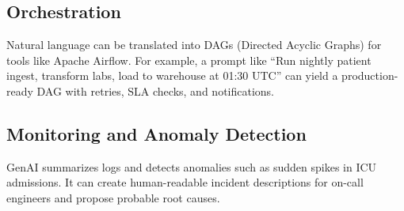 \documentclass[conference]{IEEEtran}
\begin{document}
\subsection{Orchestration}
Natural language can be translated into DAGs (Directed Acyclic Graphs) for tools like Apache Airflow. For example, a prompt like “Run nightly patient ingest, transform labs, load to warehouse at 01:30 UTC” can yield a production-ready DAG with retries, SLA checks, and notifications.

\subsection{Monitoring and Anomaly Detection}
GenAI summarizes logs and detects anomalies such as sudden spikes in ICU admissions. It can create human-readable incident descriptions for on-call engineers and propose probable root causes.
\end{document}
